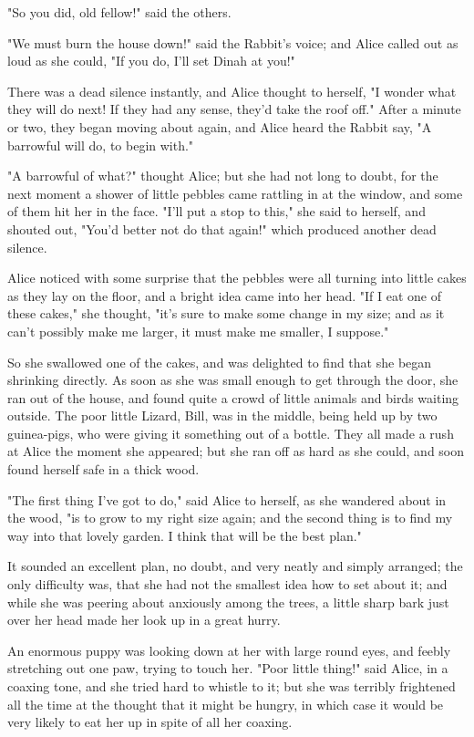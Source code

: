 "So you did, old fellow!" said the others.

"We must burn the house down!" said the Rabbit's voice; and Alice called out as loud as she could, "If you do, I'll set Dinah at you!"

There was a dead silence instantly, and Alice thought to herself, "I wonder what they will do next! If they had any sense, they'd take the roof off." After a minute or two, they began moving about again, and Alice heard the Rabbit say, "A barrowful will do, to begin with."

"A barrowful of what?" thought Alice; but she had not long to doubt, for the next moment ​a shower of little pebbles came rattling in at the window, and some of them hit her in the face. "I'll put a stop to this," she said to herself, and shouted out, "You'd better not do that again!" which produced another dead silence.

Alice noticed with some surprise that the pebbles were all turning into little cakes as they lay on the floor, and a bright idea came into her head. "If I eat one of these cakes," she thought, "it's sure to make some change in my size; and as it can't possibly make me larger, it must make me smaller, I suppose."

So she swallowed one of the cakes, and was delighted to find that she began shrinking directly. As soon as she was small enough to get through the door, she ran out of the house, and found quite a crowd of little animals and birds waiting outside. The poor little Lizard, Bill, was in the middle, being held up by two guinea-pigs, who were giving it something out of a bottle. They all made a rush at Alice the moment she appeared; but she ran off as hard ​as she could, and soon found herself safe in a thick wood.

"The first thing I've got to do," said Alice to herself, as she wandered about in the wood, "is to grow to my right size again; and the second thing is to find my way into that lovely garden. I think that will be the best plan."

It sounded an excellent plan, no doubt, and very neatly and simply arranged; the only difficulty was, that she had not the smallest idea how to set about it; and while she was peering about anxiously among the trees, a little sharp bark just over her head made her look up in a great hurry.

An enormous puppy was looking down at her with large round eyes, and feebly stretching out one paw, trying to touch her. "Poor little thing!" said Alice, in a coaxing tone, and she tried hard to whistle to it; but she was terribly frightened all the time at the thought that it might be hungry, in which case it would be very likely to eat her up in spite of all her coaxing.

